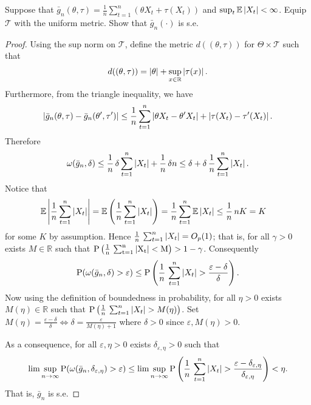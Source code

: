\documentclass[11pt,letterpaper]{article}                  %
\begin{document}
\bigskip
\begin{problem}
Suppose that $\bar{g}_n (\theta, \tau) = \frac{1}{n} \sum_{t=1}^n (\theta X_t + \tau(X_t))$ and $\sup_t \mathbb{E}\left\lvert X_t\right\rvert < \infty$.
Equip $\mathcal{T}$ with the uniform metric.
Show that $\bar{g}_n (\cdot)$ is s.e.

\medskip
\begin{proof}
Using the sup norm on $\mathcal{T}$, define the metric $d((\theta, \tau))$ for $\Theta \times \mathcal{T}$ such that 
\begin{align*}
	d((\theta, \tau)) = \left\lvert\theta\right\rvert + \sup_{x \in \mathbb{R}} \left\lvert\tau(x)\right\rvert.
\end{align*}
Furthermore, from the triangle inequality, we have
\begin{align*}
	\left\lvert\bar{g}_n (\theta, \tau) - \bar{g}_n (\theta', \tau')\right\rvert \leq \frac{1}{n} \sum_{t=1}^n \left\lvert\theta X_t - \theta' X_t\right\rvert + \left\lvert\tau(X_t) - \tau'(X_t)\right\rvert.
\end{align*}
Therefore
\begin{align*}
	\omega (\bar{g}_n, \delta) \leq \frac{1}{n} \, \delta \sum_{t=1}^n \left\lvert X_t\right\rvert + \frac{1}{n} \, \delta n \leq \delta + \delta \, \frac{1}{n} \sum_{t=1}^n \left\lvert X_t\right\rvert.
\end{align*}
Notice that 
\begin{align*}
	\mathbb{E} \left\lvert\frac{1}{n} \sum_{t=1}^n \left\lvert X_t\right\rvert\right\rvert &= \mathbb{E} \left( \frac{1}{n} \sum_{t=1}^n \left\lvert X_t\right\rvert \right) = \frac{1}{n} \sum_{t=1}^n \mathbb{E} \left\lvert X_t\right\rvert \leq \frac{1}{n} \, nK = K
\end{align*}
for some $K$ by assumption.
Hence $\frac{1}{n} \, \sum_{t=1}^n \left\lvert X_t\right\rvert = O_p (1)$; that is, for all $\gamma > 0$ exists $M \in \mathbb{R}$ such that $\rm{P} \left( \frac{1}{n} \, \sum_{t=1}^n \left\lvert X_t\right\rvert < M \right) > 1 - \gamma$.
Consequently
\begin{align*}
	{\rm P} (\omega(\bar{g}_n, \delta) > \varepsilon) \leq {\rm P} \left( \frac{1}{n} \, \sum_{t=1}^n \left\lvert X_t\right\rvert > \frac{\varepsilon - \delta}{\delta} \right).
\end{align*}
Now using the definition of boundedness in probability, for all $\eta > 0$ exists $M(\eta) \in \mathbb{R}$ such that ${\rm P} \left( \frac{1}{n} \, \sum_{t=1}^n \left\lvert X_t\right\rvert > M(\eta) \right)$.
Set $M(\eta) = \frac{\varepsilon-\delta}{\delta} \iff \delta = \frac{\varepsilon}{M(\eta) + 1}$ where $\delta > 0$ since $\varepsilon, M(\eta) > 0$.

As a consequence, for all $\varepsilon, \eta > 0$ exists $\delta_{\varepsilon, \eta} > 0$ such that
\begin{align*}
	\lim \sup_{n \to \infty} {\rm P} (\omega (\bar{g}_n, \delta_{\varepsilon, \eta}) > \varepsilon) \leq \lim \sup_{n \to \infty} {\rm P} \left( \frac{1}{n} \, \sum_{t=1}^n \left\lvert X_t\right\rvert > \frac{\varepsilon-\delta_{\varepsilon, \eta}}{\delta_{\varepsilon, \eta}} \right) < \eta.
\end{align*}
That is, $\bar{g}_n$ is s.e.
\end{proof}

\end{problem}
\end{document}
